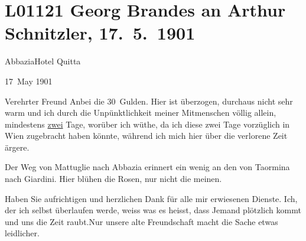 

\section[Georg Brandes an Arthur Schnitzler, 17. 5. 1901]{L01121 Georg Brandes an Arthur Schnitzler, 17. 5. 1901}
\nopagebreak{}
\rehead{ }\normalsize\beginnumbering{}
\toendnotes[C]{\smallbreak\pagebreak[2]}
\pstart
           \centering{}{\pb}AbbaziaHotel Quitta\pend
           
\pstart
           \raggedleft{}17 May 1901\pend
           
\pstart{}Verehrter Freund\pend\vspace{0.5em}
\pstart
           Anbei die 30 Gulden. Hier ist überzogen, durchaus nicht sehr warm und ich durch die
               Unpünktlichkeit meiner Mitmenschen völlig allein, mindestens \uline{zwei} Tage, worüber ich wüthe, da ich diese zwei Tage
               vorzüglich in Wien zugebracht haben könnte,
               während ich mich hier über die verlorene Zeit ärgere.\pend
           
\pstart
           Der Weg von Mattuglie nach Abbazia erinnert ein wenig an den von Taormina nach Giardini.
               Hier blühen die Rosen, nur nicht die meinen.\pend
           
\pstart
           Haben Sie aufrichtigen und herzlichen Dank für alle mir erwiesenen Dienste. Ich, der
               ich selbst überlaufen werde, weiss {\pb}was es heisst, dass Jemand plötzlich kommt und uns die Zeit raubt.\hspace*{1.5em}Nur unsere alte Freundschaft macht die Sache etwas
               leidlicher.\pend
           
